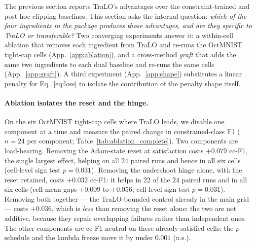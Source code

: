 \documentclass[10pt]{article}
\begin{document}
The previous section reports TraLO's advantages over the constraint-trained
and post-hoc-clipping baselines. This section asks the internal question:
\emph{which of the four ingredients in the package produces those
advantages, and are they specific to TraLO or transferable?} Two
converging experiments answer it: a within-cell ablation that removes each
ingredient from TraLO and re-runs the OctMNIST tight-cap cells
(App.~\ref{app:ablation}), and a cross-method \emph{graft} that adds the
same two ingredients to each dual baseline and re-runs the same cells
(App.~\ref{app:graft}). A third experiment (App.~\ref{app:shape})
substitutes a linear penalty for Eq.~\eqref{eq:loss} to isolate the
contribution of the penalty shape itself.

\paragraph{Ablation isolates the reset and the hinge.}
On the six OctMNIST tight-cap cells where TraLO leads, we disable one
component at a time and measure the paired change in constrained-class F1
($n{=}24$ per component; Table~\ref{tab:ablation_complete}). Two
components are load-bearing. Removing the Adam-state reset at satisfaction
costs $+0.079$ cc-F1, the single largest effect, helping on all $24$
paired runs and hence in all six cells (cell-level sign test $p\!=\!0.031$).
{Removing the undershoot hinge alone, with the reset retained, costs
$+0.032$ cc-F1: it helps in $22$ of the $24$ paired runs and in all six cells
(cell-mean gaps $+0.009$ to $+0.056$; cell-level sign test $p\!=\!0.031$). Removing
both together --- the TraLO-bounded control already in the main grid --- costs
$+0.036$, which is \emph{less} than removing the reset alone: the two are not
additive, because they repair overlapping failures rather than independent ones.}
The other components are cc-F1-neutral on these already-satisfied cells: the
$\rho$ schedule and the lambda freeze move it by under $0.001$ (n.s.).
\end{document}
